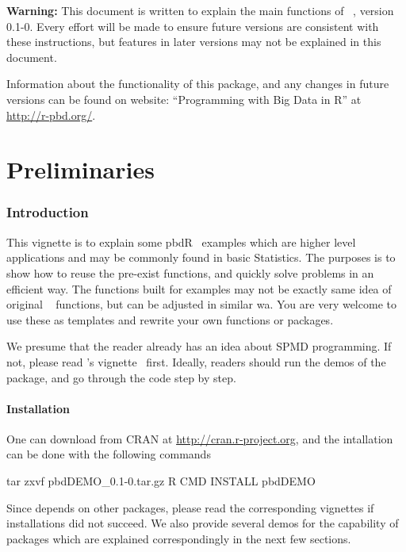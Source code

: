 {\color{red} \bf Warning:} This document is written to explain the main
functions of ~\citep{Schmidt2012pbdDEMOpackage}, version 0.1-0.
Every effort will be made to ensure future versions are consistent with
these instructions, but features in later versions may not be explained
in this document.

Information about the functionality of this package,
and any changes in future versions can be found on website:
``Programming with Big Data in R'' at
\url{http://r-pbd.org/}.


\part{Preliminaries}


\section[Introduction]{Introduction}
\label{sec:introduction}

This vignette is to explain some pbdR~\citep{pbdR2012}
examples which are higher level
applications and may be commonly found in basic Statistics.
The purposes is to show how to reuse the pre-exist functions, and
quickly solve problems in an efficient way.
The functions built for examples may not be exactly same idea of original
~\citep{Rcore}
functions, but can be adjusted in similar wa.
You are very welcome to use these as templates and rewrite your own functions
or packages.

We presume that the reader already has an idea about SPMD programming. If not,
please read 's vignette~\cite{Chen2012pbdMPIvignette} first.
Ideally, readers should run the demos of the  package,
and go through the code step by step.

\subsection[Installation]{Installation}
\label{sec:installation}

One can download  from CRAN at
\url{http://cran.r-project.org}, and
the intallation can be done with the following commands
\begin{Command}
tar zxvf pbdDEMO_0.1-0.tar.gz
R CMD INSTALL pbdDEMO
\end{Command}
Since  depends on other  packages,
please read the corresponding vignettes if installations did
not succeed.
We also provide several demos for the capability of 
packages which are explained correspondingly in the next few sections.


